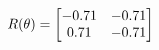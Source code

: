 \documentclass[preview]{standalone}
\begin{document}
\begin{align*}
\special{dvisvgm:raw <g id='unique000'>}R(\theta) = \begin{bmatrix}-0.71 & -0.71\\0.71 & -0.71\end{bmatrix}\special{dvisvgm:raw </g>}
\end{align*}
\end{document}
